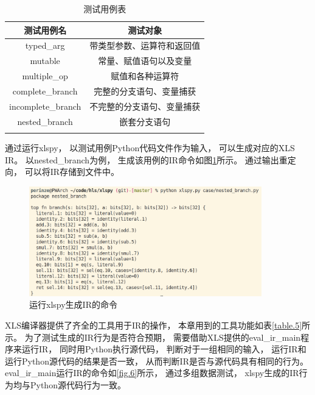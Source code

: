 \begin{table}[ht]
\begin{center}
\caption{测试用例表}

\begin{tabular}{ c c }
    \Xhline{3\arrayrulewidth}
    测试用例名             & 测试对象 \\
    \hline
    typed\_arg           & 带类型参数、运算符和返回值 \\
    mutable              & 常量、赋值语句以及变量 \\
    multiple\_op         & 赋值和各种运算符 \\
    complete\_branch     & 完整的分支语句、变量捕获 \\
    incomplete\_branch   & 不完整的分支语句、变量捕获 \\
    nested\_branch       & 嵌套分支语句 \\
    \Xhline{3\arrayrulewidth}
\end{tabular}

\label{table.2}
\end{center}
\end{table}

通过运行xlspy，
以测试用例Python代码文件作为输入，
可以生成对应的XLS IR。
以nested\_branch为例，
生成该用例的IR命令如图\ref{fig.5}所示。
通过输出重定向，
可以将IR存储到文件中。

\begin{figure}[h]
\centering 
\includegraphics[width=0.9\textwidth]{figure/xlspy_command.png}
\caption{运行xlspy生成IR的命令}
\label{fig.5}
\end{figure}

XLS编译器提供了齐全的工具用于IR的操作，
本章用到的工具功能如表\ref{table.5}所示。
为了测试生成的IR行为是否符合预期，
需要借助XLS提供的eval\_ir\_main程序来运行IR，
同时用Python执行源代码，
判断对于一组相同的输入，
运行IR和运行Python源代码的结果是否一致，
从而判断IR是否与源代码具有相同的行为。
eval\_ir\_main运行IR的命令如\ref{fig.6}所示，
通过多组数据测试，
xlspy生成的IR行为均与Python源代码行为一致。


